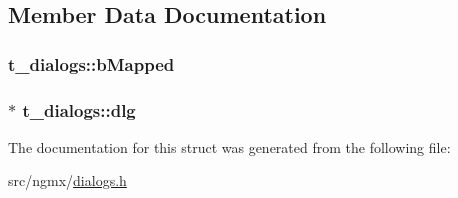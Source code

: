 \subsection{\-Member \-Data \-Documentation}
\hypertarget{structt__dialogs_af292ffc2ab0ee5faa0436608844d7373}{
\subsubsection[{b\-Mapped}]{ {\bf t\-\_\-dialogs\-::b\-Mapped}}}\label{structt__dialogs_af292ffc2ab0ee5faa0436608844d7373}
\hypertarget{structt__dialogs_ab21280650a94287dfab8fb38385261f8}{
\subsubsection[{dlg}]{$\ast$ {\bf t\-\_\-dialogs\-::dlg}}}\label{structt__dialogs_ab21280650a94287dfab8fb38385261f8}


\-The documentation for this struct was generated from the following file\-:\begin{DoxyCompactItemize}
\item 
src/ngmx/\hyperlink{dialogs_8h}{dialogs.\-h}\end{DoxyCompactItemize}
